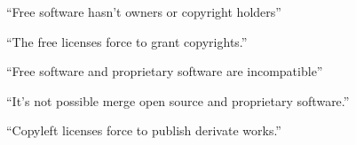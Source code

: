 \begin{frame}

\begin{center}
\huge{``Free software hasn't owners or copyright holders''}
\end{center}

\end{frame}


\begin{frame}

\begin{center}
\huge{``The free licenses force to grant copyrights.''}
\end{center}

\end{frame}



\begin{frame}

\begin{center}
\huge{``Free software and proprietary software are incompatible''}
\end{center}

\end{frame}



\begin{frame}

\begin{center}
\huge{``It's not possible merge open source and proprietary software.''}
\end{center}

\end{frame}




\begin{frame}

\begin{center}
\huge{``Copyleft licenses force to publish derivate works.''}
\end{center}

\end{frame}



